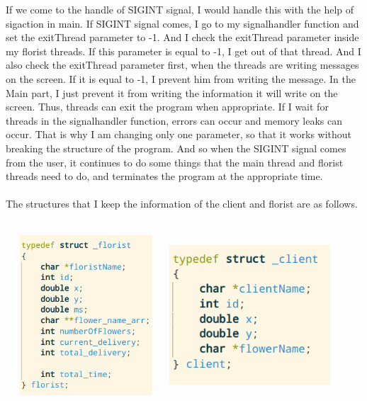 \documentclass{article}
\begin{document}
If we come to the handle of SIGINT signal, I would handle this with the help of sigaction in main. If SIGINT signal comes, I go to my signalhandler function and set the exitThread parameter to -1. And I check the exitThread parameter inside my florist threads. If this parameter is equal to -1, I get out of that thread. And I also check the exitThread parameter first, when the threads are writing messages on the screen. If it is equal to -1, I prevent him from writing the message. In the Main part, I just prevent it from writing the information it will write on the screen. Thus, threads can exit the program when appropriate. If I wait for threads in the signalhandler function, errors can occur and memory leaks can occur. That is why I am changing only one parameter, so that it works without breaking the structure of the program. And so when the SIGINT signal comes from the user, it continues to do some things that the main thread and florist threads need to do, and terminates the program at the appropriate time.
\mbox{}\\

\newpage
\paragraph{}
The structures that I keep the information of the client and florist are as follows.

\mbox{}\\
\includegraphics[width=6cm, height=6cm]{v1.png}
\includegraphics[width=6cm, height=6cm]{v2.png}
\mbox{}\\
\end{document}
